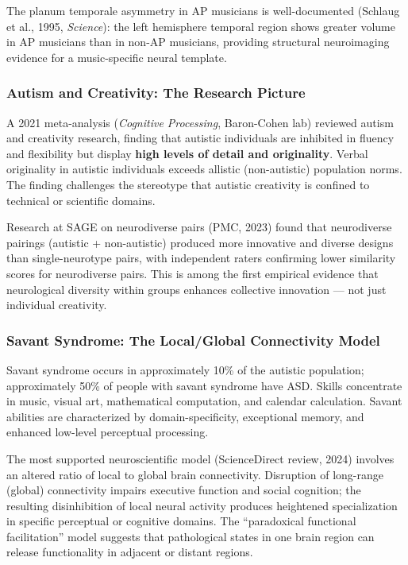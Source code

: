 \documentclass[11pt,letterpaper]{article}
\begin{document}
The planum temporale asymmetry in AP musicians is well-documented (Schlaug et al., 1995, \textit{Science}): the left hemisphere temporal region shows greater volume in AP musicians than in non-AP musicians, providing structural neuroimaging evidence for a music-specific neural template.

\subsubsection{Autism and Creativity: The Research Picture}

A 2021 meta-analysis (\textit{Cognitive Processing}, Baron-Cohen lab) reviewed autism and creativity research, finding that autistic individuals are inhibited in fluency and flexibility but display \textbf{high levels of detail and originality}. Verbal originality in autistic individuals exceeds allistic (non-autistic) population norms. The finding challenges the stereotype that autistic creativity is confined to technical or scientific domains.

Research at SAGE on neurodiverse pairs (PMC, 2023) found that neurodiverse pairings (autistic + non-autistic) produced more innovative and diverse designs than single-neurotype pairs, with independent raters confirming lower similarity scores for neurodiverse pairs. This is among the first empirical evidence that neurological diversity within groups enhances collective innovation --- not just individual creativity.

\subsubsection{Savant Syndrome: The Local/Global Connectivity Model}

Savant syndrome occurs in approximately 10\% of the autistic population; approximately 50\% of people with savant syndrome have ASD. Skills concentrate in music, visual art, mathematical computation, and calendar calculation. Savant abilities are characterized by domain-specificity, exceptional memory, and enhanced low-level perceptual processing.

The most supported neuroscientific model (ScienceDirect review, 2024) involves an altered ratio of local to global brain connectivity. Disruption of long-range (global) connectivity impairs executive function and social cognition; the resulting disinhibition of local neural activity produces heightened specialization in specific perceptual or cognitive domains. The ``paradoxical functional facilitation'' model suggests that pathological states in one brain region can release functionality in adjacent or distant regions.
\end{document}
